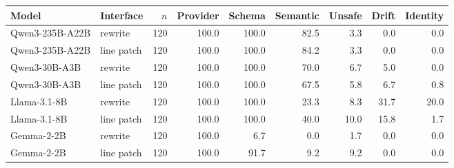 \begin{tabular}{llrrrrrrr}
\toprule
Model & Interface & $n$ & Provider & Schema & Semantic & Unsafe & Drift & Identity \\
\midrule
Qwen3-235B-A22B & rewrite & 120 & 100.0 & 100.0 & 82.5 & 3.3 & 0.0 & 0.0 \\
Qwen3-235B-A22B & line patch & 120 & 100.0 & 100.0 & 84.2 & 3.3 & 0.0 & 0.0 \\
Qwen3-30B-A3B & rewrite & 120 & 100.0 & 100.0 & 70.0 & 6.7 & 5.0 & 0.0 \\
Qwen3-30B-A3B & line patch & 120 & 100.0 & 100.0 & 67.5 & 5.8 & 6.7 & 0.8 \\
Llama-3.1-8B & rewrite & 120 & 100.0 & 100.0 & 23.3 & 8.3 & 31.7 & 20.0 \\
Llama-3.1-8B & line patch & 120 & 100.0 & 100.0 & 40.0 & 10.0 & 15.8 & 1.7 \\
Gemma-2-2B & rewrite & 120 & 100.0 & 6.7 & 0.0 & 1.7 & 0.0 & 0.0 \\
Gemma-2-2B & line patch & 120 & 100.0 & 91.7 & 9.2 & 9.2 & 0.0 & 0.0 \\
\bottomrule
\end{tabular}
